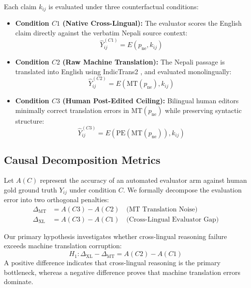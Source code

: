 \documentclass[conference]{IEEEtran}
\begin{document}
Each claim $k_{ij}$ is evaluated under three counterfactual conditions:
\begin{itemize}
    \item \textbf{Condition $C1$ (Native Cross-Lingual):} The evaluator scores the English claim directly against the verbatim Nepali source context:
    \begin{equation}
        \hat{Y}_{ij}^{(C1)} = E(p_{\text{ne}}, k_{ij})
    \end{equation}
    \item \textbf{Condition $C2$ (Raw Machine Translation):} The Nepali passage is translated into English using IndicTrans2 \cite{gala2023indictrans2}, and evaluated monolingually:
    \begin{equation}
        \hat{Y}_{ij}^{(C2)} = E(\text{MT}(p_{\text{ne}}), k_{ij})
    \end{equation}
    \item \textbf{Condition $C3$ (Human Post-Edited Ceiling):} Bilingual human editors minimally correct translation errors in $\text{MT}(p_{\text{ne}})$ while preserving syntactic structure:
    \begin{equation}
        \hat{Y}_{ij}^{(C3)} = E(\text{PE}(\text{MT}(p_{\text{ne}})), k_{ij})
    \end{equation}
\end{itemize}

\subsection{Causal Decomposition Metrics}
Let $A(C)$ represent the accuracy of an automated evaluator arm against human gold ground truth $Y_{ij}$ under condition $C$. We formally decompose the evaluation error into two orthogonal penalties:
\begin{align}
    \Delta_{\text{MT}} &= A(C3) - A(C2) \quad \text{(MT Translation Noise)} \label{eq:delta_mt} \\
    \Delta_{\text{XL}} &= A(C3) - A(C1) \quad \text{(Cross-Lingual Evaluator Gap)} \label{eq:delta_xl}
\end{align}

Our primary hypothesis investigates whether cross-lingual reasoning failure exceeds machine translation corruption:
\begin{equation}
    H_1: \Delta_{\text{XL}} - \Delta_{\text{MT}} = A(C2) - A(C1)
\end{equation}
A positive difference indicates that cross-lingual reasoning is the primary bottleneck, whereas a negative difference proves that machine translation errors dominate.
\end{document}
